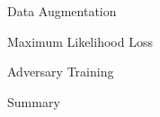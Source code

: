 \documentclass[10pt]{beamer}
\begin{document}
\begin{frame}{Data Augmentation}

\end{frame}

\begin{frame}{Maximum Likelihood Loss}

\end{frame}

\begin{frame}{Adversary Training}

\end{frame}

\begin{frame}{Summary}

\end{frame}
\end{document}
